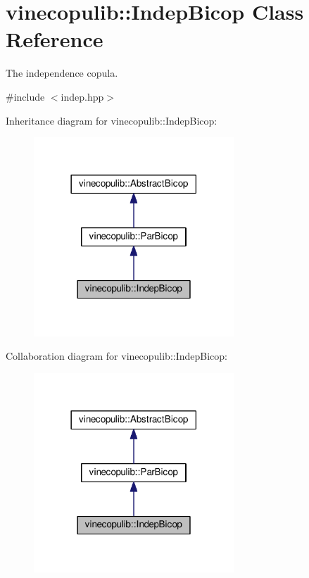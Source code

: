 \hypertarget{classvinecopulib_1_1_indep_bicop}{}\section{vinecopulib\+:\+:Indep\+Bicop Class Reference}
\label{classvinecopulib_1_1_indep_bicop}


The independence copula.  




{\ttfamily \#include $<$indep.\+hpp$>$}



Inheritance diagram for vinecopulib\+:\+:Indep\+Bicop\+:
\nopagebreak
\begin{figure}[H]
\begin{center}
\leavevmode
\includegraphics[width=213pt]{classvinecopulib_1_1_indep_bicop__inherit__graph}
\end{center}
\end{figure}


Collaboration diagram for vinecopulib\+:\+:Indep\+Bicop\+:
\nopagebreak
\begin{figure}[H]
\begin{center}
\leavevmode
\includegraphics[width=213pt]{classvinecopulib_1_1_indep_bicop__coll__graph}
\end{center}
\end{figure}
